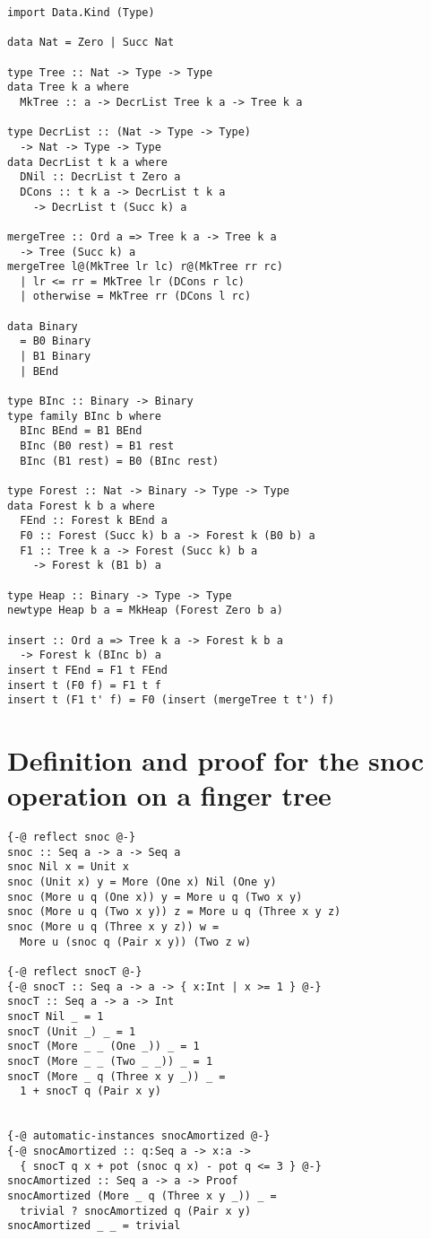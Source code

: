 \documentclass[sigplan,screen,review,anonymous]{acmart}
\begin{document}
\begin{lstlisting}
import Data.Kind (Type)

data Nat = Zero | Succ Nat

type Tree :: Nat -> Type -> Type
data Tree k a where
  MkTree :: a -> DecrList Tree k a -> Tree k a

type DecrList :: (Nat -> Type -> Type)
  -> Nat -> Type -> Type
data DecrList t k a where
  DNil :: DecrList t Zero a
  DCons :: t k a -> DecrList t k a
    -> DecrList t (Succ k) a

mergeTree :: Ord a => Tree k a -> Tree k a
  -> Tree (Succ k) a
mergeTree l@(MkTree lr lc) r@(MkTree rr rc)
  | lr <= rr = MkTree lr (DCons r lc)
  | otherwise = MkTree rr (DCons l rc)

data Binary
  = B0 Binary
  | B1 Binary
  | BEnd

type BInc :: Binary -> Binary
type family BInc b where
  BInc BEnd = B1 BEnd
  BInc (B0 rest) = B1 rest
  BInc (B1 rest) = B0 (BInc rest)

type Forest :: Nat -> Binary -> Type -> Type
data Forest k b a where
  FEnd :: Forest k BEnd a
  F0 :: Forest (Succ k) b a -> Forest k (B0 b) a
  F1 :: Tree k a -> Forest (Succ k) b a
    -> Forest k (B1 b) a

type Heap :: Binary -> Type -> Type
newtype Heap b a = MkHeap (Forest Zero b a)

insert :: Ord a => Tree k a -> Forest k b a
  -> Forest k (BInc b) a
insert t FEnd = F1 t FEnd
insert t (F0 f) = F1 t f
insert t (F1 t' f) = F0 (insert (mergeTree t t') f)
\end{lstlisting}

\section{Definition and proof for the snoc operation on a finger tree}

\begin{lstlisting}
{-@ reflect snoc @-}
snoc :: Seq a -> a -> Seq a
snoc Nil x = Unit x
snoc (Unit x) y = More (One x) Nil (One y)
snoc (More u q (One x)) y = More u q (Two x y)
snoc (More u q (Two x y)) z = More u q (Three x y z)
snoc (More u q (Three x y z)) w =
  More u (snoc q (Pair x y)) (Two z w)

{-@ reflect snocT @-}
{-@ snocT :: Seq a -> a -> { x:Int | x >= 1 } @-}
snocT :: Seq a -> a -> Int
snocT Nil _ = 1
snocT (Unit _) _ = 1
snocT (More _ _ (One _)) _ = 1
snocT (More _ _ (Two _ _)) _ = 1
snocT (More _ q (Three x y _)) _ =
  1 + snocT q (Pair x y)


{-@ automatic-instances snocAmortized @-}
{-@ snocAmortized :: q:Seq a -> x:a ->
  { snocT q x + pot (snoc q x) - pot q <= 3 } @-}
snocAmortized :: Seq a -> a -> Proof
snocAmortized (More _ q (Three x y _)) _ =
  trivial ? snocAmortized q (Pair x y)
snocAmortized _ _ = trivial

\end{lstlisting}
\end{document}
